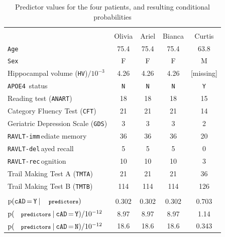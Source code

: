 \documentclass[utf8]{FrontiersinHarvard} %
\newcommand*{\pencil}{{\fontencoding{U}\fontfamily{fontawesometwo}\selectfont\symbol{210}}}
\newcommand{\mynotep}[1]{{\color{notecolour}\pencil\ #1}}
\newcommand*{\mo}[1][=]{\mathord{\,#1\,}}
\newcommand*{\p}{\mathrm{p}}%
\renewcommand*{\|}[1][]{\nonscript\:#1\vert\nonscript\:\mathopen{}}
\newcommand*{\age}{\texttt{Age}}
\newcommand*{\sex}{\texttt{Sex}}
\newcommand*{\apoe}{\texttt{APOE4}}
\newcommand*{\hv}{\texttt{HV}}
\newcommand*{\anart}{\texttt{ANART}}
\newcommand*{\cft}{\texttt{CFT}}
\newcommand*{\gds}{\texttt{GDS}}
\newcommand*{\ravltimm}{\texttt{RAVLT-imm}}
\newcommand*{\ravltdel}{\texttt{RAVLT-del}}
\newcommand*{\ravltrec}{\texttt{RAVLT-rec}}
\newcommand*{\tmta}{\texttt{TMTA}}
\newcommand*{\tmtb}{\texttt{TMTB}}
\newcommand*{\cad}{\texttt{cAD}}
\newcommand*{\yes}{\texttt{Y}}
\newcommand*{\no}{\texttt{N}}
\newcommand*{\predictors}{\texttt{\footnotesize predictors}}
\newcommand*{\ljm}{Ledley-Jaynes machine}
\begin{document}
\begin{table}[!b]
  \centering
  \begin{tabular}[b]{lcccc}
    \hline\\[-1.5\jot]
    &{\small Olivia} &{\small Ariel} &{\small Bianca} &{\small Curtis}
    \\[2\jot]
    \age&75.4&75.4&75.4&63.8 \\
    \sex&F&F&F&M \\
    Hippocampal volume (\hv)${}/10^{-3}$&4.26&4.26&4.26&[missing] \\
    \apoe\ status&\no&\no&\no&\yes \\
    Reading test (\anart)&18&18&18&15 \\
    Category Fluency Test (\cft)&21&21&21&14 \\
    Geriatric Depression Scale (\gds)&3&3&3&2 \\
    \ravltimm\,ediate memory &36&36&36&20 \\
    \ravltdel\,ayed recall &5&5&5&0 \\
   \ravltrec\,ognition &10&10&10&3 \\
    Trail Making Test A (\tmta)&21&21&21&36 \\
    Trail Making Test B (\tmtb)&114&114&114&126
    \\[\jot]
    \hline\\
    {\small $\p(\cad\mo\yes \| \predictors)$}&
    0.302&0.302&0.302&0.703
    \\
    {\small $\p(\predictors \| \cad\mo\yes)/10^{-12}$}&
    8.97&8.97&8.97&1.14
    \\
    {\small $\p(\predictors \| \cad\mo\no)/10^{-12}$}&
    18.6&18.6&18.6&0.343
    \\[\jot]
    \hline
  \end{tabular}\hfill
  \caption{Predictor values for the four patients, and resulting conditional probabilities}\label{tab:patients_data}
\end{table}
\end{document}
